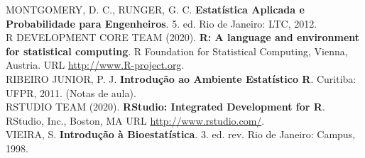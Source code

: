 \documentclass[11pt,fleqn]{book} %
\begin{document}
\noindent MONTGOMERY, D. C., RUNGER, G. C. {\bf Estatística Aplicada e Probabilidade para Engenheiros}. 5. ed. Rio de Janeiro: LTC, 2012. \\

\noindent R DEVELOPMENT CORE TEAM (2020). {\bf R: A language and environment for statistical computing}. R Foundation for Statistical Computing, Vienna, Austria. URL \url{http://www.R-project.org}. \\

\noindent RIBEIRO JUNIOR, P. J. {\bf Introdução ao Ambiente Estatístico R}. Curitiba: UFPR, 2011. (Notas de aula).\\

\noindent RSTUDIO TEAM (2020). {\bf RStudio: Integrated Development for R}. RStudio, Inc., Boston, MA URL \url{http://www.rstudio.com/}. \\

\noindent VIEIRA, S. {\bf Introdução à Bioestatística}. 3. ed. rev. Rio de Janeiro: Campus, 1998.



\end{document}

